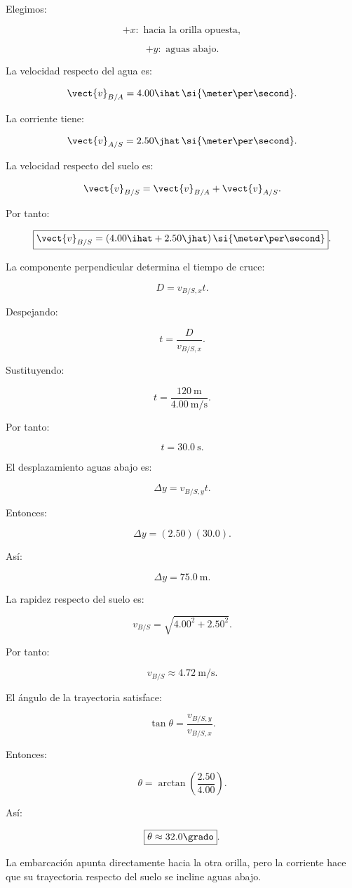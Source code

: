 \begin{explicacion}
Elegimos:

\[
+x:\text{ hacia la orilla opuesta},
\]

\[
+y:\text{ aguas abajo}.
\]

La velocidad respecto del agua es:

\[
\vect{v}_{B/A}
=
4.00\ihat\,
\si{\meter\per\second}.
\]

La corriente tiene:

\[
\vect{v}_{A/S}
=
2.50\jhat\,
\si{\meter\per\second}.
\]

La velocidad respecto del suelo es:

\[
\vect{v}_{B/S}
=
\vect{v}_{B/A}+\vect{v}_{A/S}.
\]

Por tanto:

\[
\boxed{
\vect{v}_{B/S}
=
(4.00\ihat+2.50\jhat)\,
\si{\meter\per\second}
}.
\]

La componente perpendicular determina el
tiempo de cruce:

\[
D=v_{B/S,x}t.
\]

Despejando:

\[
t=\frac{D}{v_{B/S,x}}.
\]

Sustituyendo:

\[
t
=
\frac{\SI{120}{\meter}}
{\SI{4.00}{\meter\per\second}}.
\]

Por tanto:

\[
\boxed{
t=\SI{30.0}{\second}
}.
\]

El desplazamiento aguas abajo es:

\[
\Delta y=v_{B/S,y}t.
\]

Entonces:

\[
\Delta y=(2.50)(30.0).
\]

Así:

\[
\boxed{
\Delta y=\SI{75.0}{\meter}
}.
\]

La rapidez respecto del suelo es:

\[
v_{B/S}
=
\sqrt{4.00^2+2.50^2}.
\]

Por tanto:

\[
\boxed{
v_{B/S}\approx
\SI{4.72}{\meter\per\second}
}.
\]

El ángulo de la trayectoria satisface:

\[
\tan\theta
=
\frac{v_{B/S,y}}{v_{B/S,x}}.
\]

Entonces:

\[
\theta
=
\arctan\left(\frac{2.50}{4.00}\right).
\]

Así:

\[
\boxed{
\theta\approx32.0\grado
}.
\]

La embarcación apunta directamente hacia
la otra orilla, pero la corriente hace
que su trayectoria respecto del suelo
se incline aguas abajo.
\end{explicacion}


